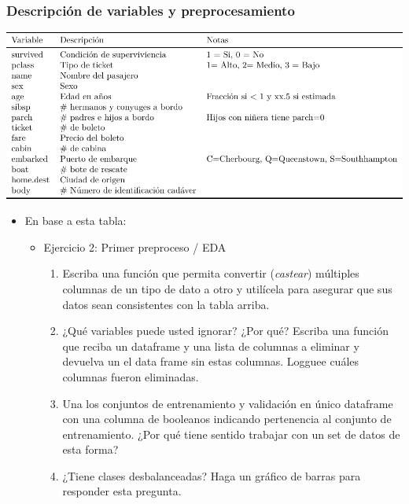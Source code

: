 \documentclass[leqno, 10pt, envcountsect]{beamer}
\numberwithin{equation}{section}
\theoremstyle{definition}
\theoremstyle{example}
\numberwithin{figure}{section}
\numberwithin{table}{section}
\let\olditem\item
\renewcommand{\item}{%
\olditem\vspace{1pt}}
\begin{document}
\begin{frame}
  \frametitle{Descripción de variables y preprocesamiento}
  \begin{center}
    \includegraphics[scale=0.65]{table_variables.pdf}
  \end{center}
  \begin{itemize}
    \item En base a esta tabla:
      \begin{itemize}
        \item Ejercicio 2: Primer preproceso / EDA
          \begin{enumerate}
            \item Escriba una función que permita convertir (\textit{castear})
              múltiples columnas de un tipo de dato a otro y utilícela para
              asegurar que sus datos sean consistentes con la tabla arriba.
            \item ¿Qué variables puede usted ignorar? ¿Por qué? Escriba una
              función que reciba un dataframe y una lista de columnas
              a eliminar y devuelva un el data frame sin estas columnas.
              Logguee cuáles columnas fueron eliminadas.
            \item Una los conjuntos de entrenamiento y validación en único
              dataframe con una columna de booleanos indicando pertenencia al
              conjunto de entrenamiento. ¿Por qué tiene sentido trabajar con un
              set de datos de esta forma?
            \item ¿Tiene clases desbalanceadas? Haga un gráfico de barras para
              responder esta pregunta.
          \end{enumerate}
      \end{itemize}
  \end{itemize}
\end{frame}
\end{document}
